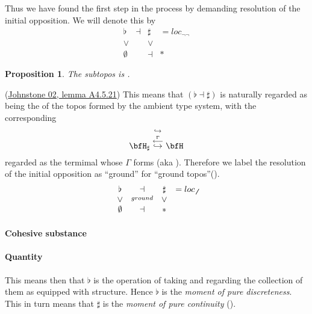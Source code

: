 \documentclass[12pt,titlepage]{article}
\newcommand{\itexarray}[1]{\begin{matrix}#1\end{matrix}}
\theoremstyle{plain}
\newtheorem{prop}{Proposition}
\theoremstyle{definition}
\theoremstyle{remark}
\begin{document}
Thus we have found the first step in the process by demanding resolution of the initial opposition. We will denote this by
\begin{displaymath}
\itexarray{
\flat &\dashv& \sharp & = loc_{\neg \neg}
\\
\vee && \vee
\\
\emptyset &&\dashv& \ast
}
\end{displaymath}
\begin{prop}
\label{}\hypertarget{}{}
The  subtopos is .
\end{prop}
(\hyperlink{Johnstone02}{Johnstone 02, lemma A4.5.21})
This means that $(\flat \dashv \sharp)$ is naturally regarded as being the  of the topos formed by the ambient type system, with the corresponding 
\begin{displaymath}
\bfH_{\sharp}
\stackrel{\hookrightarrow}{\stackrel{\stackrel{\Gamma}{\longleftarrow}}{\hookrightarrow}}
\bfH
\end{displaymath}
regarded as the termimal  whose  $\Gamma$ forms  (aka ).
Therefore we label the resolution of the initial opposition as ``ground'' for ``ground topos''().
\begin{displaymath}
\itexarray{
\flat &\dashv& \sharp & = loc_{\not\not}
\\
\vee &\stackrel{ground}{}& \vee
\\
\emptyset &\dashv& \ast
}
\end{displaymath}
\hypertarget{cohesive_substance}{}\paragraph*{{Cohesive substance}}\label{cohesive_substance}
\hypertarget{IntensiveExtensive}{}\paragraph*{{Quantity}}\label{IntensiveExtensive}
This means then that $\flat$ is the operation of taking  and regarding the collection of them as equipped with  structure. Hence $\flat$ is the \emph{moment of pure discreteness}.
This in turn means that $\sharp$ is the \emph{moment of pure continuity} ().
\end{document}
